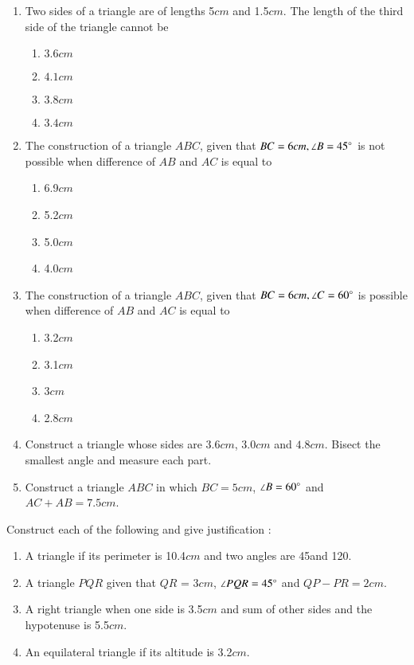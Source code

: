 \begin{enumerate}[label=\thesubsection.\arabic*,ref=\thesubsection.\theenumi]
\item Two sides of a triangle are of lengths 5$cm$ and 1.5$cm$. The length of the third side of the triangle cannot be
\begin{enumerate}
\item $3.6 cm$
\item $4.1 cm$
\item $3.8 cm$
\item $3.4 cm$
\end{enumerate}
\item The construction of a triangle $ABC$, given that $BC = 6 cm, \angle B = 45\degree$ is not possible when difference of $AB$ and $AC$ is equal to
		\begin{enumerate}
			\item 6.9$cm$
			\item 5.2$cm$
			\item 5.0$cm$
			\item 4.0$cm$
		\end{enumerate}
	\item The construction of a triangle $ABC$, given that $BC = 6 cm, \angle C = 60\degree$ is possible when difference of $AB$ and $AC$ is equal to
		\begin{enumerate}
			\item 3.2$cm$
			\item 3.1$cm$
			\item 3$cm$
			\item 2.8$cm$
		\end{enumerate}
\item Construct a triangle whose sides are $3.6 cm$, $3.0 cm$ and $4.8 cm$. Bisect the smallest angle and measure each part.
\item Construct a triangle $ABC$ in which $BC = 5 cm$, $\angle B = 60\degree$ and $AC+AB = 7.5cm$.
\end{enumerate}
Construct each of the following and give justification :
\begin{enumerate}[label=\thesubsection.\arabic*,ref=\thesubsection.\theenumi,resume*]
\item A triangle if its perimeter is 10.4$cm$ and two angles are 45\degree and 120\degree.
\item A triangle $PQR$ given that $QR$ = 3$cm$, $\angle PQR = 45\degree$ and $QP - PR = 2 cm$.
\item A right triangle when one side is 3.5$cm$ and sum of other sides and the hypotenuse
is 5.5$cm$.
\item An equilateral triangle if its altitude is 3.2$cm$.
\end{enumerate}                               
